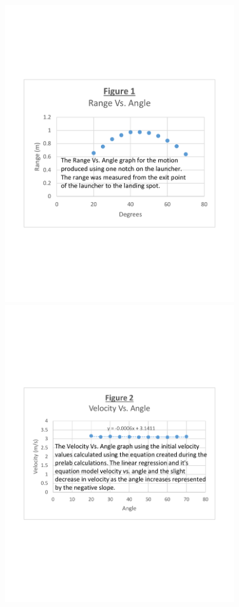 \documentclass[aps,letterpaper,11pt]{revtex4}
\begin{document}
\begin{center}
\vspace{-20mm}
\includegraphics[width=4in]{RangeVsAngle.pdf}\\
\vspace{-50mm}
\includegraphics[width=4in]{VelocityVsAngle.pdf}
\end{center}
\end{document}
